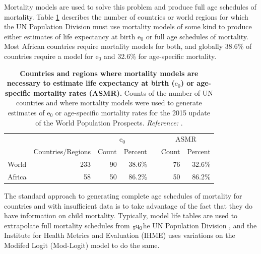 \documentclass[11pt]{article}
\newcommand{\qf}{\tensor*[_5]{\mbox{q}}{_0}}
\newcommand{\ez}{{\mbox{e}}{_0}}
\begin{document}
Mortality models are used to solve this problem and produce full age schedules of mortality.  Table \ref{tab:mxMods} describes the number of countries or world regions for which the UN Population Division must use mortality models of some kind to produce either estimates of life expectancy at birth $\ez$ or full age schedules of mortality.  Most African countries require mortality models for both, and globally 38.6\% of countries require a model for $\ez$ and 32.6\% for age-specific mortality.    

\begin{table}[htp]
\captionsetup{format=plain,font=normalsize,margin=2.4cm,justification=justified}
\caption{\textbf{Countries and regions where mortality models are necessary to estimate life expectancy at birth ($\ez$) or age-specific mortality rates (ASMR).} 
Counts of the number of UN countries  and  where mortality models were used to generate estimates of $\ez$ or age-specific mortality rates for the 2015 update of the World Population Prospects. \textit{Reference:} \cite{unWPP2015Meta}.  }
\begin{center}
\begin{tabular}{lrrrrrr}

\toprule
&  & \multicolumn{2}{c}{$\ez$} & & \multicolumn{2}{c}{ASMR}  \\
\cmidrule{3-4} \cmidrule{6-7}
& Countries/Regions & Count & Percent & & Count & Percent \\ 
\midrule
World & 233 & 90 & 38.6\% & & 76 & 32.6\% \\
Africa & 58 & 50 & 86.2\% & & 50 & 86.2\% \\

\bottomrule
\end{tabular}
\end{center}
\label{tab:mxMods}
\end{table}

The standard approach to generating complete age schedules of mortality for countries and  with insufficient data is to take advantage of the fact that they do have information on child mortality.  Typically, model life tables are used to extrapolate full mortality schedules from $\qf$he UN Population Division , and the Institute for Health Metrics and Evaluation (IHME) uses variations on the Modifed Logit (Mod-Logit) model \citep{murray2003} to do the same.  
\end{document}
